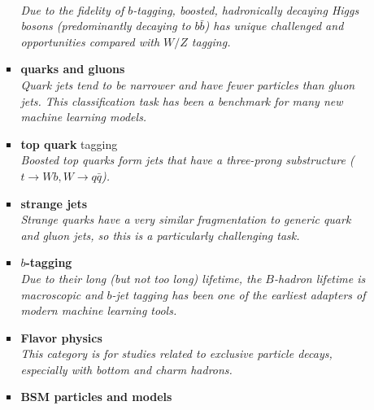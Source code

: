 \documentclass[12pt,letterpaper]{article}
\begin{document}
\begin{itemize}
\begin{itemize}
\begin{itemize}
			\\\textit{Due to the fidelity of $b$-tagging, boosted, hadronically decaying Higgs bosons (predominantly decaying to $b\bar{b}$) has unique challenged and opportunities compared with $W/Z$ tagging.}
			\item \textbf{quarks and gluons}~\cite{ATL-PHYS-PUB-2017-017,Komiske:2016rsd,Cheng:2017rdo,Stoye:DLPS2017,Chien:2018dfn,Moreno:2019bmu,Kasieczka:2018lwf,1806025,Lee:2019ssx,Lee:2019cad,Dreyer:2020brq,Romero:2021qlf,Filipek:2021qbe}
			\\\textit{Quark jets tend to be narrower and have fewer particles than gluon jets.  This classification task has been a benchmark for many new machine learning models.}
			\item \textbf{top quark} tagging~\cite{Almeida:2015jua,Stoye:DLPS2017,Kasieczka:2019dbj,Chakraborty:2020yfc,Diefenbacher:2019ezd,Butter:2017cot,Kasieczka:2017nvn,Macaluso:2018tck,Bhattacharya:2020vzu,Lim:2020igi,Dreyer:2020brq,Aguilar-Saavedra:2021rjk,Andrews:2021ejw}
			\\\textit{Boosted top quarks form jets that have a three-prong substructure ($t\rightarrow Wb,W\rightarrow q\bar{q}$).}
			\item \textbf{strange jets}~\cite{Nakai:2020kuu,Erdmann:2019blf,Erdmann:2020ovh}
			\\\textit{Strange quarks have a very similar fragmentation to generic quark and gluon jets, so this is a particularly challenging task.}
			\item \textbf{$b$-tagging}~\cite{Sirunyan:2017ezt,Guest:2016iqz,bielkov2020identifying,Bols:2020bkb,ATL-PHYS-PUB-2017-003,ATL-PHYS-PUB-2020-014}
			\\\textit{Due to their long (but not too long) lifetime, the $B$-hadron lifetime is macroscopic and $b$-jet tagging has been one of the earliest adapters of modern machine learning tools.}
			\item \textbf{Flavor physics}~\cite{1811097}
			\\\textit{This category is for studies related to exclusive particle decays, especially with bottom and charm hadrons.}
			\item \textbf{BSM particles and models}~\cite{Datta:2019ndh,Baldi:2014kfa,Chakraborty:2019imr,10.1088/2632-2153/ab9023,1792136,1801423,Chang:2020rtc,Cogollo:2020afo,Grossi:2020orx,Ngairangbam:2020ksz,Englert:2020ntw,Freitas:2020ttd,Khosa:2019kxd,Freitas:2019hbk,Stakia:2021pvp,Arganda:2021azw,Jorge:2021vpo,Ren:2021prq,Barron:2021btf,Yang:2021gge,Alvestad:2021sje,Morais:2021ead,Jung:2021tym,Drees:2021oew,Cornell:2021gut}

\end{itemize}
\end{itemize}
\end{itemize}
\end{document}
